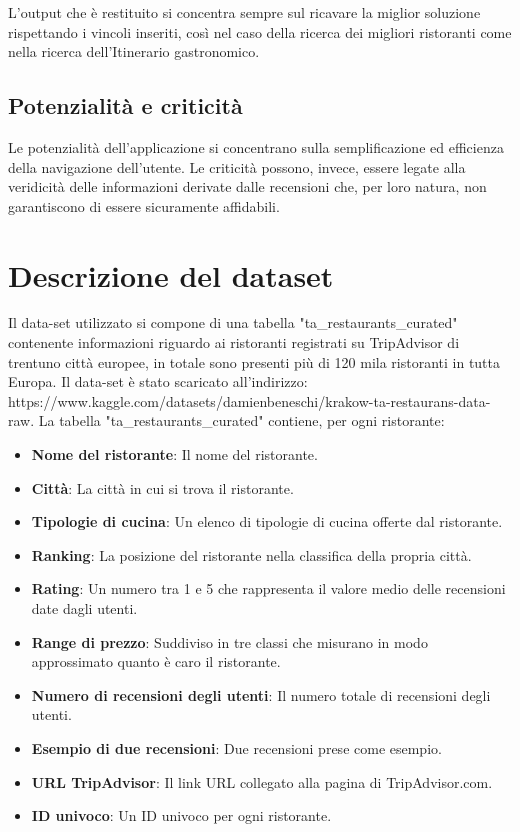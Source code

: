 \documentclass{report}
\begin{document}
L'output che è restituito si concentra sempre sul ricavare la miglior soluzione rispettando i vincoli inseriti, così nel caso della ricerca dei migliori ristoranti come nella ricerca dell'Itinerario gastronomico.

\section{Potenzialità e criticità}
Le potenzialità dell'applicazione si concentrano sulla semplificazione ed efficienza della navigazione dell'utente.
Le criticità possono, invece, essere legate alla veridicità delle informazioni derivate dalle recensioni che, per loro natura, non garantiscono di essere sicuramente affidabili.


\chapter{Descrizione del dataset}\label{cap_dataset}
Il data-set utilizzato si compone di una tabella "ta\_restaurants\_curated" contenente informazioni riguardo ai ristoranti registrati su TripAdvisor di trentuno città europee, in totale sono presenti più di 120 mila ristoranti in tutta Europa. Il data-set è stato scaricato all'indirizzo: https://www.kaggle.com/datasets/damienbeneschi/krakow-ta-restaurans-data-raw.
La tabella "ta\_restaurants\_curated" contiene, per ogni ristorante:
\begin{itemize}
    \item \textbf{Nome del ristorante}: Il nome del ristorante.
    \item \textbf{Città}: La città in cui si trova il ristorante.
    \item \textbf{Tipologie di cucina}: Un elenco di tipologie di cucina offerte dal ristorante.
    \item \textbf{Ranking}: La posizione del ristorante nella classifica della propria città.
    \item \textbf{Rating}: Un numero tra 1 e 5 che rappresenta il valore medio delle recensioni date dagli utenti.
    \item \textbf{Range di prezzo}: Suddiviso in tre classi che misurano in modo approssimato quanto è caro il ristorante.
    \item \textbf{Numero di recensioni degli utenti}: Il numero totale di recensioni degli utenti.
    \item \textbf{Esempio di due recensioni}: Due recensioni prese come esempio.
    \item \textbf{URL TripAdvisor}: Il link URL collegato alla pagina di TripAdvisor.com.
    \item \textbf{ID univoco}: Un ID univoco per ogni ristorante.
\end{itemize}
\end{document}
